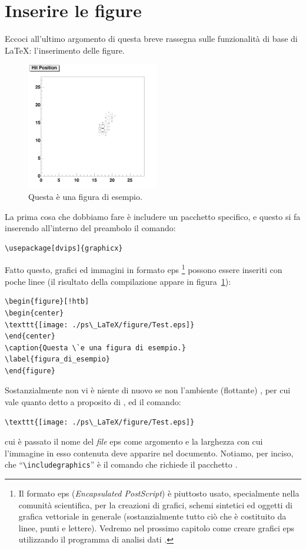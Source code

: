 \section{Inserire le figure}

Eccoci all'ultimo argomento di questa breve rassegna sulle funzionalit\`a di
base di \LaTeX: l'inserimento delle figure.
\begin{figure}[h!]
\begin{center}
\includegraphics[width=5.8cm]{./ps_LaTeX/figure/test.pdf}
\end{center}
\caption{Questa \`e una figura di esempio.}
\label{figura_di_esempio}
\end{figure}
La prima cosa che dobbiamo fare \`e includere un pacchetto specifico, e
questo si fa inserendo all'interno del preambolo il comando:
\begin{verbatim}
\usepackage[dvips]{graphicx}
\end{verbatim}
Fatto questo, grafici ed immagini in formato eps%
\footnote{
Il formato eps (\emph{Encapsulated PostScript}) \`e piuttosto usato,
specialmente nella comunit\`a scientifica, per la creazioni di grafici,
schemi sintetici ed oggetti di grafica vettoriale in generale (sostanzialmente
tutto ci\`o che \`e costituito da linee, punti e lettere).
Vedremo nel prossimo capitolo come creare grafici eps utilizzando il programma
di analisi dati \gnuplot.
}
possono essere inseriti con poche linee (il risultato della compilazione
appare in figura~\ref{figura_di_esempio}):
\begin{verbatim}
\begin{figure}[!htb]
\begin{center}
\texttt{[image: ./ps\_LaTeX/figure/Test.eps]}
\end{center}
\caption{Questa \`e una figura di esempio.}
\label{figura_di_esempio}
\end{figure}
\end{verbatim}

Sostanzialmente non vi \`e niente di nuovo se non l'ambiente (flottante)
, per cui vale quanto detto a proposito di ,
ed il comando:
\begin{verbatim}
\texttt{[image: ./ps\_LaTeX/figure/Test.eps]}
\end{verbatim}
cui \`e passato il nome del \emph{file} eps come argomento e la larghezza
con cui l'immagine in esso contenuta deve apparire nel documento.
Notiamo, per inciso, che ``\verb|\includegraphics|'' \`e il comando che
richiede il pacchetto .


